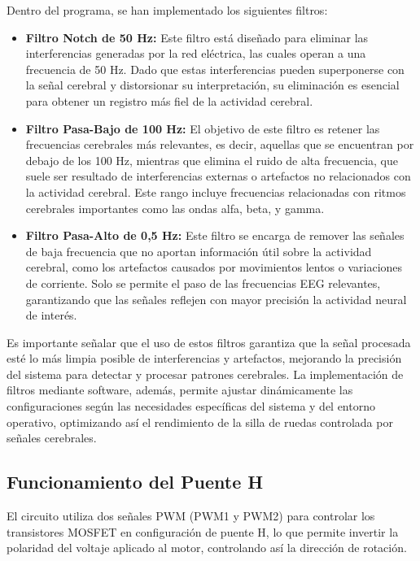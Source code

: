 \documentclass{article}
\begin{document}
Dentro del programa, se han implementado los siguientes filtros:
\begin{itemize}
    \item \textbf{Filtro Notch de 50 Hz:} Este filtro está diseñado para eliminar las interferencias generadas por la red eléctrica, las cuales operan a una frecuencia de 50 Hz. Dado que estas interferencias pueden superponerse con la señal cerebral y distorsionar su interpretación, su eliminación es esencial para obtener un registro más fiel de la actividad cerebral.
    \item \textbf{Filtro Pasa-Bajo de 100 Hz:} El objetivo de este filtro es retener las frecuencias cerebrales más relevantes, es decir, aquellas que se encuentran por debajo de los 100 Hz, mientras que elimina el ruido de alta frecuencia, que suele ser resultado de interferencias externas o artefactos no relacionados con la actividad cerebral. Este rango incluye frecuencias relacionadas con ritmos cerebrales importantes como las ondas alfa, beta, y gamma.
    \item \textbf{Filtro Pasa-Alto de 0,5 Hz:} Este filtro se encarga de remover las señales de baja frecuencia que no aportan información útil sobre la actividad cerebral, como los artefactos causados por movimientos lentos o variaciones de corriente. Solo se permite el paso de las frecuencias EEG relevantes, garantizando que las señales reflejen con mayor precisión la actividad neural de interés.
\end{itemize}

Es importante señalar que el uso de estos filtros garantiza que la señal procesada esté lo más limpia posible de interferencias y artefactos, mejorando la precisión del sistema para detectar y procesar patrones cerebrales. La implementación de filtros mediante software, además, permite ajustar dinámicamente las configuraciones según las necesidades específicas del sistema y del entorno operativo, optimizando así el rendimiento de la silla de ruedas controlada por señales cerebrales.

\subsection{Funcionamiento del Puente H}

El circuito utiliza dos señales PWM (PWM1 y PWM2) para controlar los transistores MOSFET en configuración de puente H, lo que permite invertir la polaridad del voltaje aplicado al motor, controlando así la dirección de rotación. 
\end{document}
